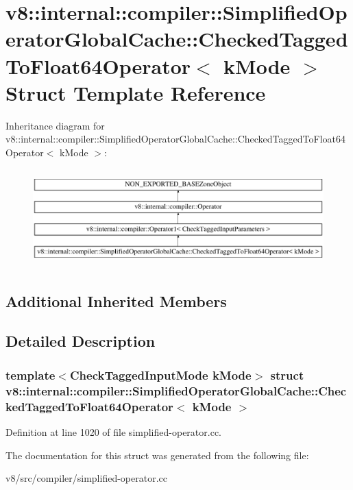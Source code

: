\hypertarget{structv8_1_1internal_1_1compiler_1_1SimplifiedOperatorGlobalCache_1_1CheckedTaggedToFloat64Operator}{}\section{v8\+:\+:internal\+:\+:compiler\+:\+:Simplified\+Operator\+Global\+Cache\+:\+:Checked\+Tagged\+To\+Float64\+Operator$<$ k\+Mode $>$ Struct Template Reference}
\label{structv8_1_1internal_1_1compiler_1_1SimplifiedOperatorGlobalCache_1_1CheckedTaggedToFloat64Operator}
Inheritance diagram for v8\+:\+:internal\+:\+:compiler\+:\+:Simplified\+Operator\+Global\+Cache\+:\+:Checked\+Tagged\+To\+Float64\+Operator$<$ k\+Mode $>$\+:\begin{figure}[H]
\begin{center}
\leavevmode
\includegraphics[height=3.816014cm]{structv8_1_1internal_1_1compiler_1_1SimplifiedOperatorGlobalCache_1_1CheckedTaggedToFloat64Operator}
\end{center}
\end{figure}
\subsection*{Additional Inherited Members}


\subsection{Detailed Description}
\subsubsection*{template$<$Check\+Tagged\+Input\+Mode k\+Mode$>$\newline
struct v8\+::internal\+::compiler\+::\+Simplified\+Operator\+Global\+Cache\+::\+Checked\+Tagged\+To\+Float64\+Operator$<$ k\+Mode $>$}



Definition at line 1020 of file simplified-\/operator.\+cc.



The documentation for this struct was generated from the following file\+:\begin{DoxyCompactItemize}
\item 
v8/src/compiler/simplified-\/operator.\+cc\end{DoxyCompactItemize}
